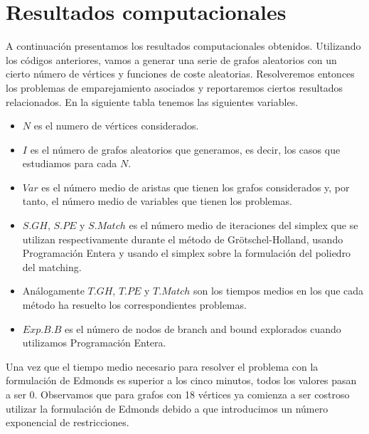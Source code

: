 \documentclass[twoside,a4paper,openright,12pt]{book}
\begin{document}
\section{Resultados computacionales}
A continuación presentamos los resultados computacionales obtenidos. Utilizando los códigos anteriores, vamos a generar una serie de grafos aleatorios con un cierto número de vértices y funciones de coste aleatorias. Resolveremos entonces los problemas de emparejamiento asociados y reportaremos ciertos resultados relacionados. En la siguiente tabla tenemos las siguientes variables.
\begin{itemize}
\item $N$ es el numero de vértices considerados.
\item $I$ es el número de grafos aleatorios que generamos, es decir, los casos que estudiamos para cada $N$.
\item $Var$ es el número medio de aristas que tienen los grafos considerados y, por tanto, el número medio de variables que tienen los problemas.
\item $S.GH$, $S.PE$ y $S.Match$ es el número medio de iteraciones del simplex que se utilizan respectivamente durante el método de Grötschel-Holland, usando Programación Entera y usando el simplex sobre la formulación del poliedro del matching.
\item Análogamente $T.GH$, $T.PE$ y $T.Match$ son los tiempos medios en los que cada método ha resuelto los correspondientes problemas.
\item $Exp.B.B$ es el número de nodos de branch and bound explorados cuando utilizamos Programación Entera.
\end{itemize} 
Una vez que el tiempo medio necesario para resolver el problema con la formulación de Edmonds es superior a los cinco minutos, todos los valores pasan a ser $0$. Observamos que para grafos con 18 vértices ya comienza a ser costroso utilizar la formulación de Edmonds debido a que introducimos un número exponencial de restricciones.
\end{document}
